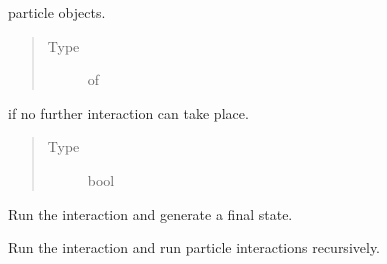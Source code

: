 \documentclass[letterpaper,10pt,english]{sphinxmanual}
\begin{document}
\begin{fulllineitems}
\begin{fulllineitems}
\label{\detokenize{code_structure:scdc.event.Event.out}}
particle  objects.
\begin{quote}\begin{description}
\item[{Type}] \leavevmode
{} of 

\end{description}\end{quote}

\end{fulllineitems}


\begin{fulllineitems}
\label{\detokenize{code_structure:scdc.event.Event.final}}
 if no further interaction can take place.
\begin{quote}\begin{description}
\item[{Type}] \leavevmode
bool

\end{description}\end{quote}

\end{fulllineitems}


\begin{fulllineitems}
\label{\detokenize{code_structure:scdc.event.Event.act}}
Run the interaction and generate a final state.

\end{fulllineitems}


\begin{fulllineitems}
\label{\detokenize{code_structure:scdc.event.Event.chain}}
Run the interaction and run particle interactions recursively.

\end{fulllineitems}


\end{fulllineitems}
\end{document}
